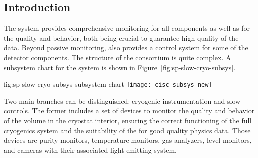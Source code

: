 \subsection{Introduction}
\label{sec:fddp-slow-cryo-intro}



The  system provides 
comprehensive monitoring for all  components as well as for the \lar quality and behavior, both being crucial
to guarantee high-quality of the data. Beyond passive monitoring,  also provides a control system for some of the detector components. 
The structure of the  consortium is quite complex. A subsystem chart
for the  system is shown in Figure~\ref{fig:sp-slow-cryo-subsys}. 

\begin{dunefigure}{fig:sp-slow-cryo-subsys}
{ subsystem chart}
\texttt{[image: cisc\_subsys-new]}  %
\end{dunefigure}

Two main branches can be distinguished: cryogenic instrumentation and slow controls. The former includes a set of devices 
to monitor the quality and behavior of the \lar volume in the cryostat interior, ensuring the correct functioning of
the full cryogenics system and the suitability of the  for good quality physics data. Those devices are 
purity monitors, temperature monitors, gas analyzers, \lar level monitors, and cameras with their associated
light emitting system.


